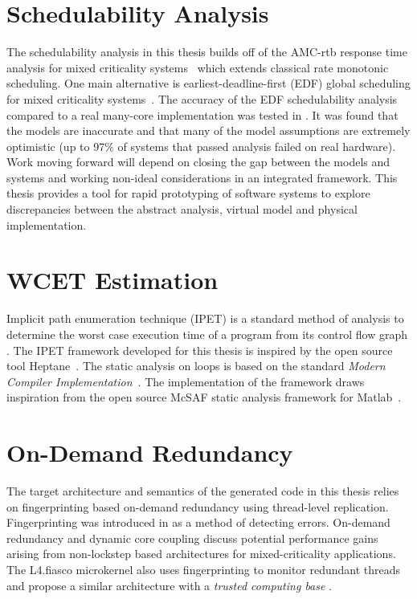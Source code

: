 \section{Schedulability Analysis}

The schedulability analysis in this thesis builds off of the AMC-rtb response time analysis for mixed criticality systems~\cite{baruah2011response} which extends classical rate monotonic scheduling. One main alternative is earliest-deadline-first (EDF) global scheduling for mixed criticality systems~\cite{kim2013novel}. The accuracy of the EDF schedulability analysis compared to a real many-core implementation was tested in \cite{sigrist2015mixed}. It was found that the models are inaccurate and that many of the model assumptions are extremely optimistic (up to 97\% of systems that passed analysis failed on real hardware). Work moving forward will depend on closing the gap between the models and systems and working non-ideal considerations in an integrated framework. This thesis provides a tool for rapid prototyping of software systems to explore discrepancies between the abstract analysis, virtual model and physical implementation.


\section{WCET Estimation}

	Implicit path enumeration technique (IPET) is a standard method of analysis to determine the worst case execution time of a program from its control flow graph \cite{li1995performance}. 
	The IPET framework developed for this thesis is inspired by the open source tool Heptane~\cite{heptane}. 
	The static analysis on loops is based on the standard \emph{Modern Compiler Implementation}~\cite{andrew2002modern}. 
	The implementation of the framework draws inspiration from the open source McSAF static analysis framework for Matlab~\cite{mcsaf}.

\section{On-Demand Redundancy}
	The target architecture and semantics of the generated code in this thesis relies on fingerprinting based on-demand redundancy using thread-level replication.
 	Fingerprinting was introduced in \cite{Smolens:04} as a method of detecting errors. 
 	On-demand redundancy \cite{Meyer:CASES11,fu2013demand} and dynamic core coupling \cite{lafrieda2007utilizing} discuss potential performance gains arising from non-lockstep based architectures for mixed-criticality applications.  
 	The L4.fiasco microkernel also uses fingerprinting to monitor redundant threads \cite{dobel2012operating} and propose a similar architecture with a \emph{trusted computing base} \cite{dobel2012watches}. 

